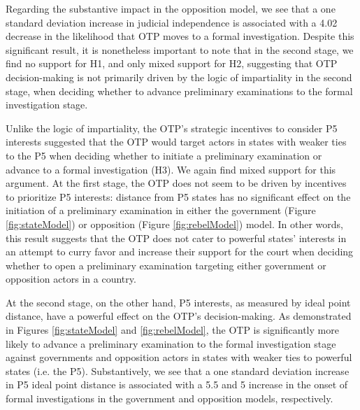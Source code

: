 Regarding the substantive impact in the opposition model, we see that a one standard deviation increase in judicial independence is associated with a 4.02 decrease in the likelihood that OTP moves to a formal investigation. Despite this significant result, it is nonetheless important to note that in the second stage,  we find no support for H1, and only mixed support for H2, suggesting that OTP decision-making is not primarily driven by the logic of impartiality in the second stage, when deciding whether to advance preliminary examinations to the formal investigation stage.

Unlike the logic of impartiality, the OTP's strategic incentives to consider P5 interests suggested that the OTP would target actors in states with weaker ties to the P5 when deciding whether to initiate a preliminary examination or advance to a formal investigation (H3). We again find mixed support for this argument. At the first stage, the OTP does not seem to be driven by incentives to prioritize P5 interests: distance from P5 states has no significant effect on the initiation of a preliminary examination in either the government (Figure \ref{fig:stateModel}) or opposition (Figure \ref{fig:rebelModel}) model. In other words, this result suggests that the OTP does not cater to powerful states' interests in an attempt to curry favor and increase their support for the court when deciding whether to open a preliminary examination targeting either government or opposition actors in a country.

At the second stage, on the other hand, P5 interests, as measured by ideal point distance, have a powerful effect on the OTP's decision-making. As demonstrated in Figures \ref{fig:stateModel} and \ref{fig:rebelModel}, the OTP is significantly more likely to advance a preliminary examination to the formal investigation stage against governments and opposition actors in states with weaker ties to powerful states (i.e. the P5). Substantively, we see that a one standard deviation increase in P5 ideal point distance is associated with a 5.5 and 5 increase in the onset of formal investigations in the government and opposition models, respectively.

